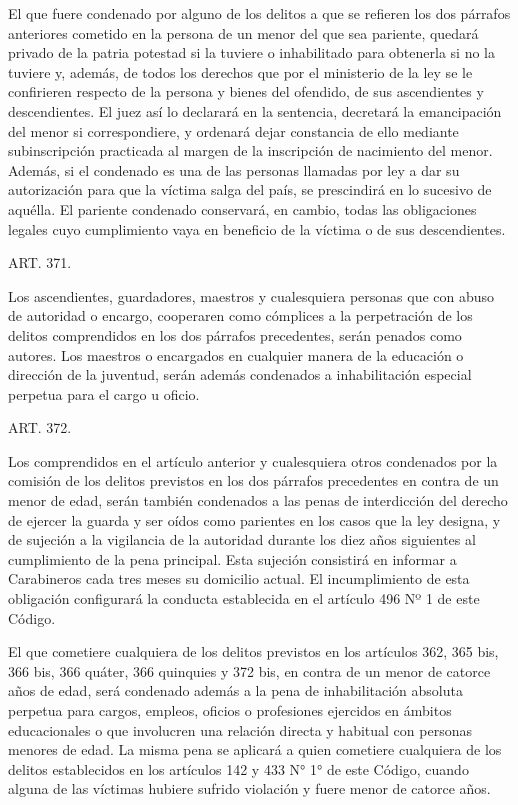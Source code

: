     El que fuere condenado por alguno de los delitos a que se refieren los dos párrafos anteriores cometido en la persona de un menor del que sea pariente, quedará privado de la patria potestad si la tuviere o inhabilitado para obtenerla si no la tuviere y, además, de todos los derechos que por el ministerio de la ley se le confirieren respecto de la persona y bienes del ofendido, de sus ascendientes y descendientes. El juez así lo declarará en la sentencia, decretará la emancipación del menor si correspondiere, y ordenará dejar constancia de ello mediante subinscripción practicada al margen de la inscripción de nacimiento del menor. Además, si el condenado es una de las personas llamadas por ley a dar su autorización para que la víctima salga del país, se prescindirá en lo sucesivo de aquélla.
    El pariente condenado conservará, en cambio, todas las obligaciones legales cuyo cumplimiento vaya en beneficio de la víctima o de sus descendientes.



    ART. 371.

    Los ascendientes, guardadores, maestros y cualesquiera personas que con abuso de autoridad o encargo, cooperaren como cómplices a la perpetración de los delitos comprendidos en los dos párrafos precedentes, serán penados como autores.
    Los maestros o encargados en cualquier manera de la educación o dirección de la juventud, serán además condenados a inhabilitación especial perpetua para el cargo u oficio.


    ART. 372.

    Los comprendidos en el artículo anterior y cualesquiera otros condenados por la comisión de los delitos previstos en los dos párrafos precedentes en contra de un menor de edad, serán también condenados a las penas de interdicción del derecho de ejercer la guarda y ser oídos como parientes en los casos que la ley designa, y de sujeción a la vigilancia de la autoridad durante los diez años siguientes al cumplimiento de la pena principal. Esta sujeción consistirá en informar a Carabineros cada tres meses su domicilio actual. El incumplimiento de esta obligación configurará la conducta establecida en el artículo 496 Nº 1 de este Código.

    El que cometiere cualquiera de los delitos previstos en los artículos 362, 365 bis, 366 bis, 366 quáter, 366 quinquies y 372 bis, en contra de un menor de catorce años de edad, será condenado además a la pena de inhabilitación absoluta perpetua para cargos, empleos, oficios o profesiones ejercidos en ámbitos educacionales o que involucren una relación directa y habitual con personas menores de edad. La misma pena se aplicará a quien cometiere cualquiera de los delitos establecidos en los artículos 142 y 433 N° 1° de este Código, cuando alguna de las víctimas hubiere sufrido violación y fuere menor de catorce años.

